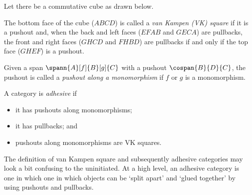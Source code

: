 \begin{definition}
    Let there be a commutative cube as drawn below.
    \begin{center}
    \end{center}
    The bottom face of the cube (\(ABCD\)) is called a
    \emph{van Kampen (VK) square} if it is a pushout and, when the back and
    left faces (\(EFAB\) and \(GECA\)) are pullbacks, the front and right faces
    (\(GHCD\) and \(FHBD\)) are pullbacks if and only if the top face (\(GHEF\))
    is a pushout.
\end{definition}

\begin{definition}
    Given a span \(\spann{A}[f]{B}[g]{C}\) with a pushout \(\cospan{B}{D}{C}\),
    the pushout is called a \emph{pushout along a monomorphism} if \(f\) or
    \(g\) is a monomorphism.
\end{definition}

\begin{definition}
    A category is \emph{adhesive} if
    \begin{itemize}
        \item it has pushouts along monomorphisms;
        \item it has pullbacks; and
        \item pushouts along monomorphisms are VK squares.
    \end{itemize}
\end{definition}

The definition of van Kampen square and subsequently adhesive categories may
look a bit confusing to the uninitiated.
At a high level, an adhesive category is one in which one in which objects can
be `split apart' and `glued together' by using pushouts and pullbacks.

